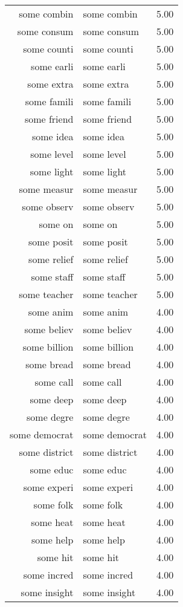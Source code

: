 \begin{table}[ht]
\begin{tabular}{rlr}
  some combin & some combin & 5.00 \\ 
  some consum & some consum & 5.00 \\ 
  some counti & some counti & 5.00 \\ 
  some earli & some earli & 5.00 \\ 
  some extra & some extra & 5.00 \\ 
  some famili & some famili & 5.00 \\ 
  some friend & some friend & 5.00 \\ 
  some idea & some idea & 5.00 \\ 
  some level & some level & 5.00 \\ 
  some light & some light & 5.00 \\ 
  some measur & some measur & 5.00 \\ 
  some observ & some observ & 5.00 \\ 
  some on & some on & 5.00 \\ 
  some posit & some posit & 5.00 \\ 
  some relief & some relief & 5.00 \\ 
  some staff & some staff & 5.00 \\ 
  some teacher & some teacher & 5.00 \\ 
  some anim & some anim & 4.00 \\ 
  some believ & some believ & 4.00 \\ 
  some billion & some billion & 4.00 \\ 
  some bread & some bread & 4.00 \\ 
  some call & some call & 4.00 \\ 
  some deep & some deep & 4.00 \\ 
  some degre & some degre & 4.00 \\ 
  some democrat & some democrat & 4.00 \\ 
  some district & some district & 4.00 \\ 
  some educ & some educ & 4.00 \\ 
  some experi & some experi & 4.00 \\ 
  some folk & some folk & 4.00 \\ 
  some heat & some heat & 4.00 \\ 
  some help & some help & 4.00 \\ 
  some hit & some hit & 4.00 \\ 
  some incred & some incred & 4.00 \\ 
  some insight & some insight & 4.00 \\ 

\end{tabular}
\end{table}
